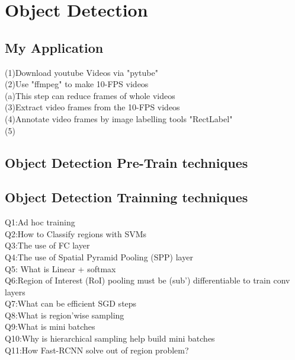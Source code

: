 \chapter{Object Detection}
\label{cha:intro}
\section{My Application}
(1)Download youtube Videos via "pytube"\\
(2)Use "ffmpeg" to make 10-FPS videos\\
	(a)This step can reduce frames of whole videos\\
(3)Extract video frames from the 10-FPS videos\\
(4)Annotate video frames by image labelling tools "RectLabel"\\
(5)
\section{Object Detection Pre-Train techniques}


\section{Object Detection Trainning techniques}
Q1:Ad hoc training\\
Q2:How to Classify regions with SVMs\\
Q3:The use of FC layer\\
Q4:The use of Spatial Pyramid Pooling (SPP) layer\\
Q5: What is Linear + softmax\\
Q6:Region of Interest (RoI) pooling must be (sub') 
differentiable to train conv layers\\
Q7:What can be efficient SGD steps\\
Q8:What is region'wise sampling\\
Q9:What is mini batches\\
Q10:Why is hierarchical sampling help build mini
batches\\
Q11:How Fast-RCNN solve out of region problem?
